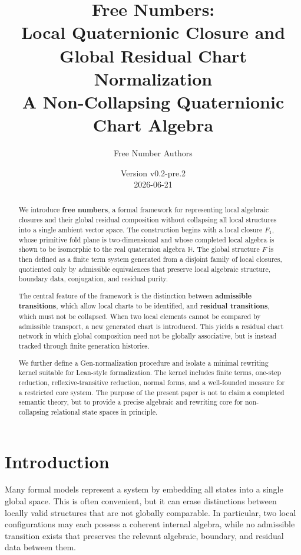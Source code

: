 \documentclass[11pt]{article}
\title{Free Numbers:\\Local Quaternionic Closure and Global Residual Chart Normalization\\\large A Non-Collapsing Quaternionic Chart Algebra}
\author{Free Number Authors}
\date{Version v0.2-pre.2\\2026-06-21}
\begin{document}
\maketitle

\begin{abstract}
We introduce \textbf{free numbers}, a formal framework for representing local algebraic closures and their global residual composition without collapsing all local structures into a single ambient vector space. The construction begins with a local closure $F_1$, whose primitive fold plane is two-dimensional and whose completed local algebra is shown to be isomorphic to the real quaternion algebra $\mathbb H$. The global structure $F$ is then defined as a finite term system generated from a disjoint family of local closures, quotiented only by admissible equivalences that preserve local algebraic structure, boundary data, conjugation, and residual purity.

The central feature of the framework is the distinction between \textbf{admissible transitions}, which allow local charts to be identified, and \textbf{residual transitions}, which must not be collapsed. When two local elements cannot be compared by admissible transport, a new generated chart is introduced. This yields a residual chart network in which global composition need not be globally associative, but is instead tracked through finite generation histories.

We further define a Gen-normalization procedure and isolate a minimal rewriting kernel suitable for Lean-style formalization. The kernel includes finite terms, one-step reduction, reflexive-transitive reduction, normal forms, and a well-founded measure for a restricted core system. The purpose of the present paper is not to claim a completed semantic theory, but to provide a precise algebraic and rewriting core for non-collapsing relational state spaces in principle.
\end{abstract}

\tableofcontents

\section{Introduction}

Many formal models represent a system by embedding all states into a single global space. This is often convenient, but it can erase distinctions between locally valid structures that are not globally comparable. In particular, two local configurations may each possess a coherent internal algebra, while no admissible transition exists that preserves the relevant algebraic, boundary, and residual data between them.
\end{document}
